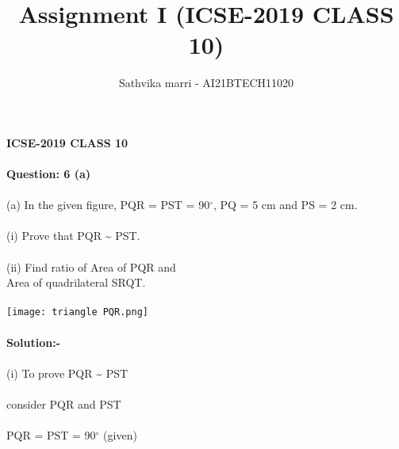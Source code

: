 \documentclass[a4paper,12pt,twocolumn]{article}
\begin{document}
{\title{Assignment I (ICSE-2019 CLASS 10)}}
{\author{Sathvika marri - AI21BTECH11020}}

\maketitle
\textbf{{ICSE-2019 CLASS 10}}\\\\
\textbf{Question: 6 (a)}\\\\
(a) In the given figure, \angle PQR = \angle PST = 90$^{\circ}$, PQ = 5 cm and PS = 2 cm.\\\\
(i) Prove that \triangle PQR \hspace{0.1cm} \sim \hspace{0.1cm}  \triangle PST.\\\\
(ii) Find \hspace{0.1cm} ratio \hspace{0.1cm} of \hspace{0.1cm} Area \hspace{0.1cm} of \triangle PQR \hspace{0.1cm} and\hspace{0.1cm}\\
Area \hspace{0.1cm}  of \hspace{0.1cm} quadrilateral \hspace{0.1cm} SRQT.\\\\
\texttt{[image: triangle PQR.png]}\\\\
\textbf{Solution:- }\\\\
(i)\hspace{0.1cm}  To \hspace{0.2cm} prove \hspace{0.2cm} \triangle PQR \hspace{0.1cm} \sim \hspace{0.1cm} \triangle PST\\\\
consider \hspace{0.1cm}  \triangle PQR \hspace{0.2cm} and \hspace{0.2cm} \triangle PST\\\\
\angle PQR = \angle PST \hspace{0.1cm} = 90$^{\circ}$ \hspace{0.1cm} (given)\\\\
\end{document}
